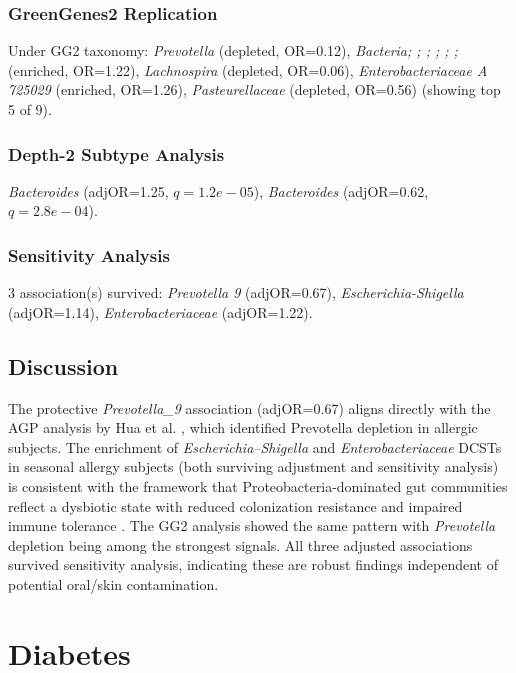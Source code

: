 \documentclass[11pt,a4paper]{article}
\begin{document}
\subsubsection{GreenGenes2 Replication}
Under GG2 taxonomy: \textit{Prevotella} (depleted, OR=0.12), \textit{Bacteria;  ;  ;  ;  ;  ;  } (enriched, OR=1.22), \textit{Lachnospira} (depleted, OR=0.06), \textit{Enterobacteriaceae A 725029} (enriched, OR=1.26), \textit{Pasteurellaceae} (depleted, OR=0.56) (showing top 5 of 9).

\subsubsection{Depth-2 Subtype Analysis}
\textit{Bacteroides} (adjOR=1.25, $q=1.2e-05$), \textit{Bacteroides} (adjOR=0.62, $q=2.8e-04$).

\subsubsection{Sensitivity Analysis}
3 association(s) survived: \textit{Prevotella 9} (adjOR=0.67), \textit{Escherichia-Shigella} (adjOR=1.14), \textit{Enterobacteriaceae} (adjOR=1.22).

\subsection{Discussion}
The protective \textit{Prevotella\_9} association (adjOR=0.67) aligns directly with the AGP analysis by Hua et al. \cite{Hua2016_AGP_allergy}, which identified Prevotella depletion in allergic subjects. The enrichment of \textit{Escherichia--Shigella} and \textit{Enterobacteriaceae} DCSTs in seasonal allergy subjects (both surviving adjustment and sensitivity analysis) is consistent with the framework that Proteobacteria-dominated gut communities reflect a dysbiotic state with reduced colonization resistance and impaired immune tolerance \cite{Hoskinson2023_allergy}. The GG2 analysis showed the same pattern with \textit{Prevotella} depletion being among the strongest signals. All three adjusted associations survived sensitivity analysis, indicating these are robust findings independent of potential oral/skin contamination.
\newpage

\section{Diabetes}
\end{document}
